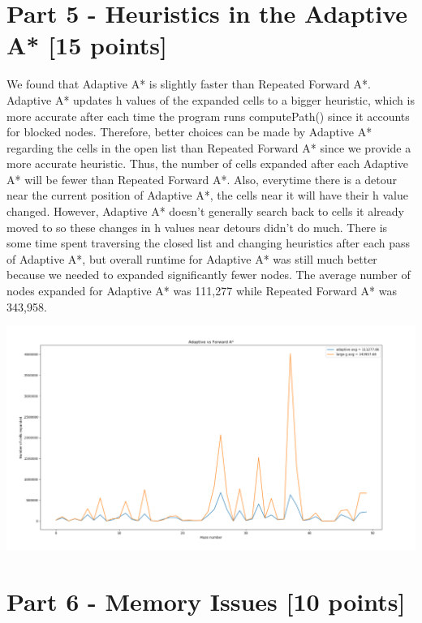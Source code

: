 \documentclass[a4paper]{article}
\theoremstyle{definition}
\theoremstyle{plain}
\begin{document}
\section*{Part 5 - Heuristics in the Adaptive A* [15 points]}
We found that Adaptive A* is slightly faster than Repeated Forward A*. Adaptive A* updates h values of the expanded cells to a bigger heuristic, which is more accurate after each time the program runs computePath() since it accounts for blocked nodes. Therefore, better choices can be made by Adaptive A* regarding the cells in the open list than Repeated Forward A* since we provide a more accurate heuristic. Thus, the number of cells expanded after each Adaptive A* will be fewer than Repeated Forward A*. Also, everytime there is a detour near the current position of Adaptive A*, the cells near it will have their h value changed. However, Adaptive A* doesn’t generally search back to cells it already moved to so these changes in h values near detours didn’t do much. There is some time spent traversing the closed list and changing heuristics after each pass of Adaptive A*, but overall runtime for Adaptive A* was still much better because we needed to expanded significantly fewer nodes. The average number of nodes expanded for Adaptive A* was 111,277 while Repeated Forward A* was 343,958.

\begin{center}
\includegraphics[scale=.8]{part5.PNG}
\end{center}



\section*{Part 6 - Memory Issues [10 points]}
\end{document}
